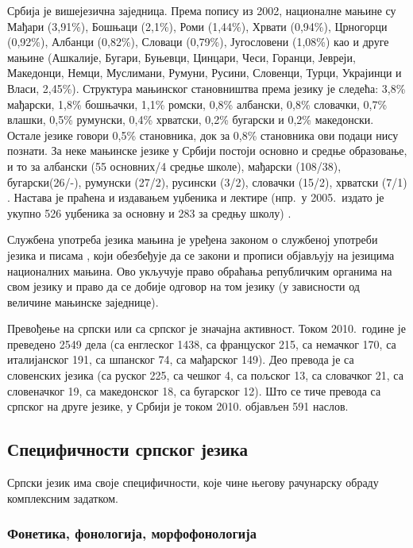 \begin{multicols}{2}
Србија је вишејезична заједница. Према попису из 2002, националне мањине \cite{Ombudsman} су Мађари (3,91\%), Бошњаци (2,1\%), Роми (1,44\%), Хрвати (0,94\%), Црногорци (0,92\%), Албанци (0,82\%), Словаци (0,79\%), Југословени (1,08\%) као и друге мањине (Ашкалије, Бугари, Буњевци, Цинцари, Чеси, Горанци, Јевреји, Македонци, Немци, Муслимани, Румуни, Русини, Словенци, Турци, Украјинци и Власи, 2,45\%).  Структура мањинског становништва према језику је следећа: 3,8\% мађарски, 1,8\% бошњачки, 1,1\% ромски, 0,8\% албански, 0,8\% словачки, 0,7\% влашки, 0,5\% румунски, 0,4\% хрватски, 0,2\% бугарски и 0,2\% македонски. Остале језике говори 0,5\% становника, док за 0,8\% становника ови подаци нису познати. За неке мањинске језике у Србији постоји основно и средње образовање, и то за албански (55 основних/4 средње школе), мађарски (108/38), бугарски(26/-), румунски (27/2), русински (3/2), словачки (15/2), хрватски (7/1) \cite{GOD2010}. Настава је праћена и издавањем уџбеника и лектире (нпр.~у 2005.~издато је укупно 526 уџбеника за основну и 283 за средњу  школу) \cite{HDR}. 

Службена употреба језика мањина је уређена законом о службеној употреби језика и писама \cite{SGRS}, који обезбеђује да се закони и прописи објављују на језицима националних мањина. Ово укључује право обраћања републичким органима на свом језику и право да се добије одговор на том језику (у зависности од величине мањинске заједнице). 

Превођење на српски или са српског је значајна активност. Током 2010.~године је преведено 2549 дела (са енглеског 1438, са француског 215, са немачког 170, са италијанског 191, са шпанског 74, са мађарског 149). Део превода је са словенских језика (са руског 225, са чешког 4, са пољског 13, са словачког 21, са словеначког 19, са македонског 18, са бугарског 12). Што се тиче превода са српског на друге језике, у Србији је током 2010. објављен 591 наслов.

\subsection {Специфичности српског језика}
  
Српски језик има своје специфичности, које чине његову рачунарску обраду комплексним задатком. 


\subsubsection {Фонетика, фонологија, морфофонологија}
  

\end{multicols}
